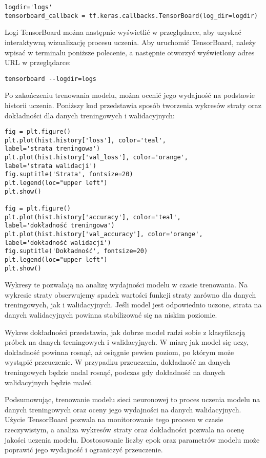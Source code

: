 \begin{verbatim}
logdir='logs'
tensorboard_callback = tf.keras.callbacks.TensorBoard(log_dir=logdir)
\end{verbatim}

Logi TensorBoard można następnie wyświetlić w przeglądarce, aby uzyskać interaktywną wizualizację procesu uczenia. Aby uruchomić TensorBoard, należy wpisać w terminalu poniższe polecenie, a następnie otworzyć wyświetlony adres URL w przeglądarce:

\begin{verbatim}
tensorboard --logdir=logs
\end{verbatim}

Po zakończeniu trenowania modelu, można ocenić jego wydajność na podstawie historii uczenia. Poniższy kod przedstawia sposób tworzenia wykresów straty oraz dokładności dla danych treningowych i walidacyjnych:

\begin{verbatim}
fig = plt.figure()
plt.plot(hist.history['loss'], color='teal', 
label='strata treningowa')
plt.plot(hist.history['val_loss'], color='orange', 
label='strata walidacji')
fig.suptitle('Strata', fontsize=20)
plt.legend(loc="upper left")
plt.show()

fig = plt.figure()
plt.plot(hist.history['accuracy'], color='teal', 
label='dokładność treningowa')
plt.plot(hist.history['val_accuracy'], color='orange', 
label='dokładność walidacji')
fig.suptitle('Dokładność', fontsize=20)
plt.legend(loc="upper left")
plt.show()
\end{verbatim}

Wykresy te pozwalają na analizę wydajności modelu w czasie trenowania. Na wykresie straty obserwujemy spadek wartości funkcji straty zarówno dla danych treningowych, jak i walidacyjnych. Jeśli model jest odpowiednio uczone, strata na danych walidacyjnych powinna stabilizować się na niskim poziomie.

Wykres dokładności przedstawia, jak dobrze model radzi sobie z klasyfikacją próbek na danych treningowych i walidacyjnych. W miarę jak model się uczy, dokładność powinna rosnąć, aż osiągnie pewien poziom, po którym może wystąpić przeuczenie. W przypadku przeuczenia, dokładność na danych treningowych będzie nadal rosnąć, podczas gdy dokładność na danych walidacyjnych będzie maleć.

Podsumowując, trenowanie modelu sieci neuronowej to proces uczenia modelu na danych treningowych oraz oceny jego wydajności na danych walidacyjnych. Użycie TensorBoard pozwala na monitorowanie tego procesu w czasie rzeczywistym, a analiza wykresów straty oraz dokładności pozwala na ocenę jakości uczenia modelu. Dostosowanie liczby epok oraz parametrów modelu może poprawić jego wydajność i ograniczyć przeuczenie.

